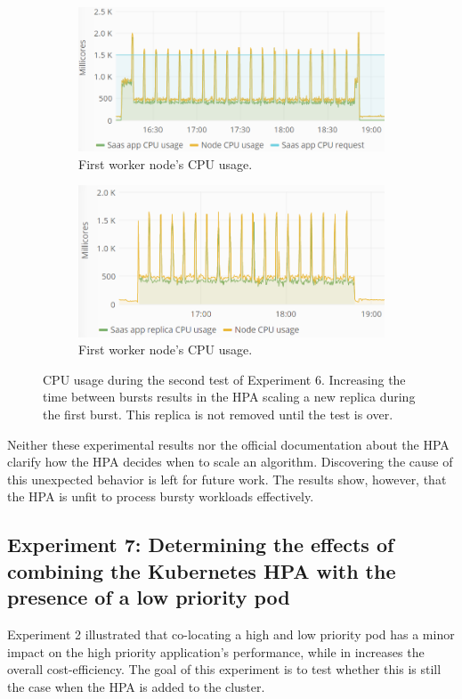 \begin{figure}
\centering
\begin{subfigure}[b]{\columnwidth}
\centering
\includegraphics[width=0.70\columnwidth]{Images/Experiments/CPU/Grafana/cpu-saas-hpa-bursty-3-1.PNG}
\caption{First worker node's CPU usage.}
\label{fig:cpu-saas-hpa-bursty-3-1}
\end{subfigure}
\hfill
\begin{subfigure}[b]{\columnwidth}
\centering
\includegraphics[width=0.70\columnwidth]{Images/Experiments/CPU/Grafana/cpu-saas-hpa-bursty-3-2.PNG}
\caption{First worker node's CPU usage.}
\label{fig:cpu-saas-hpa-bursty-3-2}
\end{subfigure}
\hfill
\caption{CPU usage during the second test of Experiment 6. Increasing the time between bursts results in the HPA scaling a new replica during the first burst. This replica is not removed until the test is over.}
\label{fig:cpu-saas-hpa-bursty-2}
\end{figure}

Neither these experimental results nor the official documentation about the HPA~\citep{hpa-algorithm-details} clarify how the HPA decides when to scale an algorithm. Discovering the cause of this unexpected behavior is left for future work. The results show, however, that the HPA is unfit to process bursty workloads effectively.


\subsection{Experiment 7: Determining the effects of combining the Kubernetes HPA with the presence of a low priority pod}
Experiment 2 illustrated that co-locating a high and low priority pod has a minor impact on the high priority application's performance, while in increases the overall cost-efficiency. The goal of this experiment is to test whether this is still the case when the HPA is added to the cluster. 

